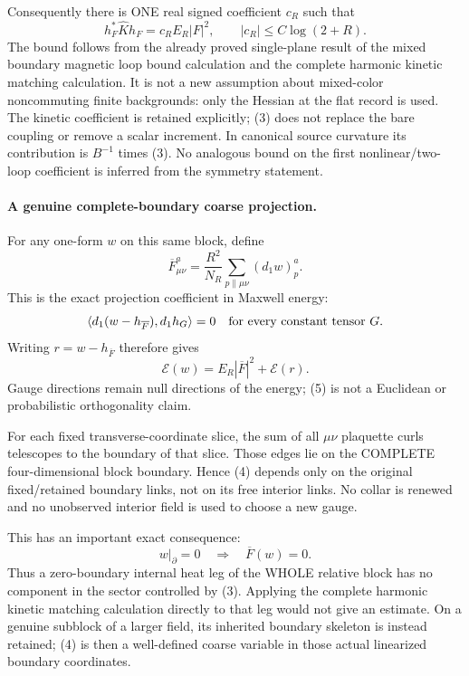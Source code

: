 \documentclass[11pt]{article}
\begin{document}
Consequently there is ONE real signed coefficient $c_R$ such that
\[
 \boxed{h_F^*\widehat K h_F=c_R E_R|F|^2,\qquad
                   |c_R|\le C\log(2+R).}                       \tag{3}
\]
The bound follows from the already proved single-plane result of
the mixed boundary magnetic loop bound calculation and the complete harmonic kinetic matching calculation. It is not a new assumption about mixed-color noncommuting
finite backgrounds: only the Hessian at the flat record is used.
The kinetic coefficient is retained explicitly; (3) does not replace
the bare coupling or remove a scalar increment. In canonical source
curvature its contribution is $B^{-1}$ times (3).
No analogous bound on the first nonlinear/two-loop coefficient is
inferred from the symmetry statement.

\paragraph{A genuine complete-boundary coarse projection.}
For any one-form $w$ on this same block, define
\[
 \overline F_{\mu\nu}^a=
       \frac{R^2}{N_R}\sum_{p\parallel\mu\nu}(d_1w)_p^a.          \tag{4}
\]
This is the exact projection coefficient in Maxwell energy:
\[
 \langle d_1(w-h_{\overline F}),d_1h_G\rangle=0
                    \quad\hbox{for every constant tensor }G.
\]
Writing $r=w-h_{\overline F}$ therefore gives
\[
 \mathcal E(w)=E_R|\overline F|^2+\mathcal E(r).                  \tag{5}
\]
Gauge directions remain null directions of the energy; (5) is not a
Euclidean or probabilistic orthogonality claim.

For each fixed transverse-coordinate slice, the sum of all
$\mu\nu$ plaquette curls telescopes to the boundary of that slice.
Those edges lie on the COMPLETE four-dimensional block boundary.
Hence (4) depends only on the original fixed/retained boundary links,
not on its free interior links. No collar is renewed and no unobserved
interior field is used to choose a new gauge.

This has an important exact consequence:
\[
 \boxed{w|_{\partial}=0\quad\Longrightarrow\quad
                           \overline F(w)=0.}                  \tag{6}
\]
Thus a zero-boundary internal heat leg of the WHOLE relative block
has no component in the sector controlled by (3). Applying the complete harmonic kinetic matching calculation directly
to that leg would not give an estimate. On a genuine subblock of a
larger field, its inherited boundary skeleton is instead retained;
(4) is then a well-defined coarse variable in those actual linearized
boundary coordinates.
\end{document}
